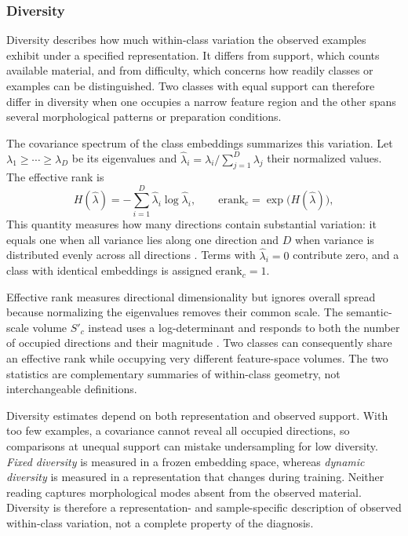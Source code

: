 \documentclass[11pt]{article}
\begin{document}
\subsubsection{Diversity}
\label{sec:diversity-signal}
Diversity describes how much within-class variation the observed examples exhibit under a specified representation. It differs from support, which counts available material, and from difficulty, which concerns how readily classes or examples can be distinguished. Two classes with equal support can therefore differ in diversity when one occupies a narrow feature region and the other spans several morphological patterns or preparation conditions.

The covariance spectrum of the class embeddings summarizes this variation. Let $\lambda_1\geq\cdots\geq\lambda_D$ be its eigenvalues and $\widehat{\lambda}_i=\lambda_i/\sum_{j=1}^{D}\lambda_j$ their normalized values. The effective rank is
\begin{equation}
  H(\widehat{\lambda})=-\sum_{i=1}^{D}\widehat{\lambda}_i\log\widehat{\lambda}_i,
  \qquad
  \mathrm{erank}_c=\exp\bigl(H(\widehat{\lambda})\bigr),
  \label{eq:effective-rank}
\end{equation}
\noindent This quantity measures how many directions contain substantial variation: it equals one when all variance lies along one direction and $D$ when variance is distributed evenly across all directions \citep{roy2007effectiveRank}. Terms with $\widehat{\lambda}_i=0$ contribute zero, and a class with identical embeddings is assigned $\mathrm{erank}_c=1$.

Effective rank measures directional dimensionality but ignores overall spread because normalizing the eigenvalues removes their common scale. The semantic-scale volume $S'_c$ instead uses a log-determinant and responds to both the number of occupied directions and their magnitude \citep{ma2023semanticScale}. Two classes can consequently share an effective rank while occupying very different feature-space volumes. The two statistics are complementary summaries of within-class geometry, not interchangeable definitions.

Diversity estimates depend on both representation and observed support. With too few examples, a covariance cannot reveal all occupied directions, so comparisons at unequal support can mistake undersampling for low diversity. \emph{Fixed diversity} is measured in a frozen embedding space, whereas \emph{dynamic diversity} is measured in a representation that changes during training. Neither reading captures morphological modes absent from the observed material. Diversity is therefore a representation- and sample-specific description of observed within-class variation, not a complete property of the diagnosis.
\end{document}
